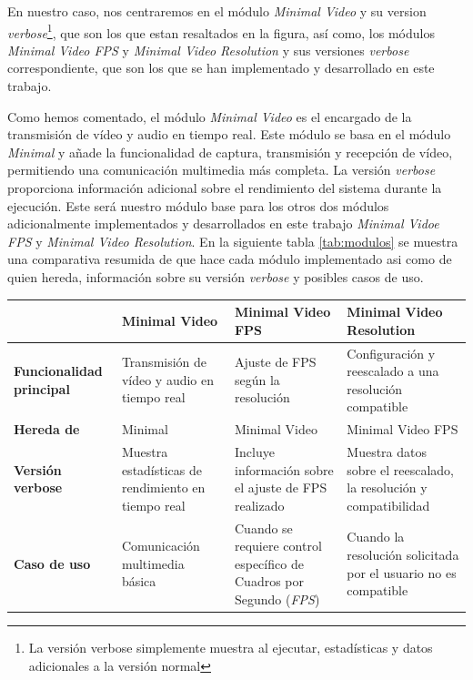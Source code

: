 \vspace{\baselineskip}
En nuestro caso, nos centraremos en el módulo \textit{Minimal Video} y su version \textit{verbose}\footnote{La versión verbose simplemente muestra al ejecutar, estadísticas y datos adicionales a la versión normal}, que son los que estan resaltados en la figura, así como, los módulos \textit{Minimal Video FPS} y \textit{Minimal Video Resolution} y sus versiones \textit{verbose} correspondiente, que son los que se han implementado y desarrollado en este trabajo.

\vspace{\baselineskip}
Como hemos comentado, el módulo \textit{Minimal Video} es el encargado de la transmisión de vídeo y audio en tiempo real. Este módulo se basa en el módulo \textit{Minimal} y añade la funcionalidad de captura, transmisión y recepción de vídeo, permitiendo una comunicación multimedia más completa. La versión \textit{verbose} proporciona información adicional sobre el rendimiento del sistema durante la ejecución. Este será nuestro módulo base para los otros dos módulos adicionalmente implementados y desarrollados en este trabajo \textit{Minimal Vidoe FPS} y \textit{Minimal Video Resolution}. En la siguiente tabla \ref{tab:modulos} se muestra una comparativa resumida de que hace cada módulo implementado asi como de quien hereda, información sobre su versión \textit{verbose} y posibles casos de uso.

\begin{center}
\label{tab:modulos}
\begin{tabular}{|p{2.6cm}|p{4cm}|p{4cm}|p{5cm}|}
    \cline{2-4} %
    \multicolumn{1}{c|}{} & %
    \textbf{Minimal Video} & 
    \textbf{Minimal Video FPS} & 
    \textbf{Minimal Video Resolution} \\
    \hline
    \textbf{Funcionalidad principal} & 
    Transmisión de vídeo y audio en tiempo real & 
    Ajuste de FPS según la resolución & 
    Configuración y reescalado a una resolución compatible \\
    \hline
    \textbf{Hereda de} & 
    Minimal & 
    Minimal Video & 
    Minimal Video FPS \\
    \hline
    \textbf{Versión verbose} & 
    Muestra estadísticas de rendimiento en tiempo real & 
    Incluye información sobre el ajuste de FPS realizado & 
    Muestra datos sobre el reescalado, la resolución y compatibilidad \\
    \hline

    \textbf{Caso de uso} & 
    Comunicación multimedia básica & 
    Cuando se requiere control específico de Cuadros por Segundo (\textit{FPS}) & 
    Cuando la resolución solicitada por el usuario no es compatible \\
    \hline
\end{tabular}
\end{center}